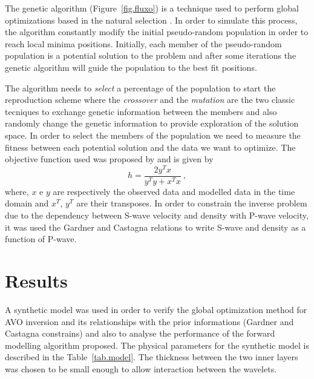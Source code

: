 \documentclass{vie16}
\begin{document}
The genetic algorithm (Figure~\ref{fig.fluxo}) is a technique used to perform 
global optimizations based in the natural selection \citep{Holland1975}. In 
order to simulate this process, the algorithm constantly modify the initial 
pseudo-random population in order to reach local minima positions. 
Initially, each member of the pseudo-random population is a potential 
solution to the problem and after some iterations the genetic algorithm will 
guide the population to the best fit positions.

The algorithm needs to \textit{select} a percentage of the population to start 
the reproduction scheme where the \textit{crossover} and the 
\textit{mutation} are the two classic tecniques to exchange genetic 
information between the members and also randomly change the genetic 
information to provide exploration of the solution space. In order to select 
the members of the population we need to measure the fitness between each 
potential solution and the data we want to optimize. The objective function 
used was proposed by \cite{Porsani2000} and is given by
\begin{equation}
h = \frac{2y^{T} x} {y^{T}y + x^{T}x} \ ,
\label{eq.Porsani}
\end{equation}
where, $x$ e $y$ are respectively the observed data and modelled data in 
the time domain and  $x^{T}$, $y^{T}$ are their transposes. In order to 
constrain the inverse problem due to the dependency between S-wave 
velocity and density with P-wave velocity, it was used the Gardner 
\citep{Gardner01121974} and Castagna \citep{Castagna01041985} relations 
to write S-wave and density as a function of P-wave.

\section{Results}
A synthetic model was used in order to verify the global optimization 
method for AVO inversion and its relationships with the prior informations 
(Gardner and Castagna constrains) and also to analyse the performance of 
the forward modelling algorithm proposed. The physical parameters for the 
synthetic model is described in the Table~\ref{tab.model}. The thickness 
between the two 
inner layers was chosen to be small enough to allow interaction between the 
wavelets.
\end{document}
